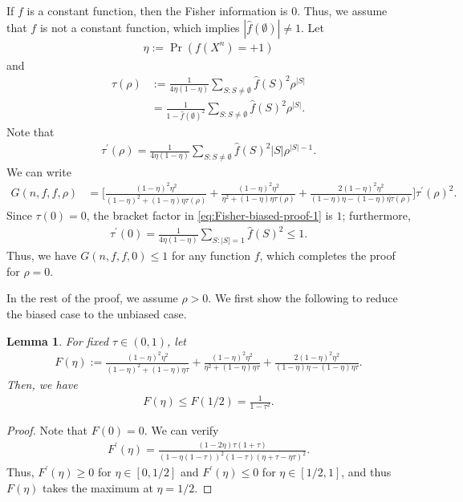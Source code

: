 \documentclass[journal,draftcls, onecolumn]{IEEEtran}
\newtheorem{lemma}{Lemma}
\begin{document}
If $f$ is a constant function, then the Fisher information is $0$. Thus, we assume 
that $f$ is not a constant function, which implies $|\widehat{f}(\emptyset)|\neq 1$. 
Let
\begin{align*}
\eta := \Pr(f(X^n) = +1)
\end{align*}
and
\begin{align*}
\tau(\rho) &:= \frac{1}{4\eta(1-\eta)} \sum_{S: S \neq \emptyset} \widehat{f}(S)^2 \rho^{|S|} \\
&= \frac{1}{1-\widehat{f}(\emptyset)^2}  \sum_{S: S \neq \emptyset} \widehat{f}(S)^2 \rho^{|S|}. 
\end{align*}
Note that
\begin{align*}
\tau^\prime(\rho) = \frac{1}{4\eta(1-\eta)} \sum_{S: S \neq \emptyset} \widehat{f}(S)^2 |S| \rho^{|S|-1}.
\end{align*}
We can write 
\begin{align}
G(n,f,f,\rho) &= \bigg[ \frac{(1-\eta)^2\eta^2}{(1-\eta)^2 + (1-\eta)\eta \tau(\rho)} 
 + \frac{(1-\eta)^2\eta^2}{\eta^2+(1-\eta)\eta \tau(\rho)} + \frac{2(1-\eta)^2\eta^2}{(1-\eta)\eta - (1-\eta)\eta \tau(\rho)}  \bigg] \tau^\prime(\rho)^2.
 \label{eq:Fisher-biased-proof-1}
\end{align}
Since $\tau(0)=0$, the bracket factor in \eqref{eq:Fisher-biased-proof-1} is $1$; furthermore, 
\begin{align*}
\tau^\prime(0) = \frac{1}{4\eta(1-\eta)} \sum_{S: |S| =1} \widehat{f}(S)^2 \le 1.
\end{align*}
Thus, we have $G(n,f,f,0) \le 1$ for any function $f$, which completes the
proof for $\rho=0$. 

In the rest of the proof, we assume $\rho>0$.
We first show the following to reduce the biased case to the unbiased case.
\begin{lemma} \label{lemma:Fisher-proof-biased-unbiased}
For fixed $\tau \in (0,1)$, let
\begin{align*}
F(\eta) := \frac{(1-\eta)^2\eta^2}{(1-\eta)^2 + (1-\eta)\eta \tau} 
 + \frac{(1-\eta)^2\eta^2}{\eta^2+(1-\eta)\eta \tau} + \frac{2(1-\eta)^2\eta^2}{(1-\eta)\eta - (1-\eta)\eta \tau}. 
\end{align*}
Then, we have
\begin{align*}
F(\eta) \le F(1/2) = \frac{1}{1-\tau^2}.
\end{align*}
\end{lemma}
\begin{proof}
Note that $F(0)=0$. We can verify
\begin{align*}
F^\prime(\eta) = \frac{(1-2\eta) \tau(1+\tau)}{(1-\eta(1-\tau))^2(1-\tau)(\eta+\tau-\eta\tau)^2}.
\end{align*}
Thus, $F^\prime(\eta) \ge 0$ for $\eta\in [0,1/2]$ and $F^\prime(\eta)\le 0$ for $\eta \in [1/2,1]$,
and thus $F(\eta)$ takes the maximum at $\eta=1/2$.
\end{proof}
\end{document}
